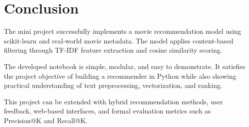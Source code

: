 \documentclass[12pt,a4paper]{report}
\begin{document}
\chapter{Conclusion}

The mini project successfully implements a movie recommendation model using
scikit-learn and real-world movie metadata. The model applies content-based
filtering through TF-IDF feature extraction and cosine similarity scoring.

The developed notebook is simple, modular, and easy to demonstrate. It satisfies
the project objective of building a recommender in Python while also showing
practical understanding of text preprocessing, vectorization, and ranking.

This project can be extended with hybrid recommendation methods, user feedback,
web-based interfaces, and formal evaluation metrics such as Precision@K and
Recall@K.
\end{document}
